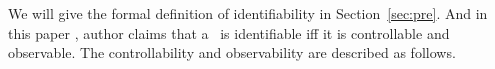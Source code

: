 	
	
 We will give the formal definition of identifiability in Section~\ref{sec:pre}. And in this paper \cite{Cheng2011Identification}, author claims that a \BCN\ is identifiable iff it is controllable and observable. The controllability and observability are described as follows. 

